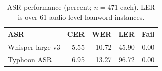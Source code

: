\begin{table}[t]
\centering
\caption{ASR performance (percent; $n=471$ each). LER is over 61 audio-level loanword instances.}
\label{tab:asr}
\small
\begin{tabular}{lrrrr}
\toprule
ASR & CER & WER & LER & Fail \\
\midrule
Whisper large-v3 & 5.55 & 10.72 & 45.90 & 0.00 \\
Typhoon ASR & 6.95 & 13.27 & 96.72 & 0.00 \\
\bottomrule
\end{tabular}
\end{table}
